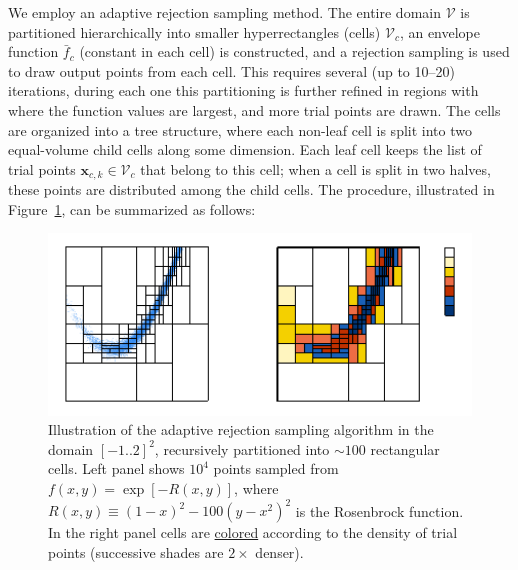 \documentclass[12pt]{article}
\newcommand{\bx}{\boldsymbol{x}}
\begin{document}
We employ an adaptive rejection sampling method.
The entire domain $\mathcal{V}$ is partitioned hierarchically into smaller hyperrectangles (cells) $\mathcal{V}_c$, an envelope function $\bar f_c$ (constant in each cell) is constructed, and a rejection sampling is used to draw output points from each cell. This requires several (up to 10--20) iterations, during each one this partitioning is further refined in regions with where the function values are largest, and more trial points are drawn. The cells are organized into a tree structure, where each non-leaf cell is split into two equal-volume child cells along some dimension. Each leaf cell keeps the list of trial points $\bx_{c,k}\in\mathcal{V}_c$ that belong to this cell; when a cell is split in two halves, these points are distributed among the child cells.
The procedure, illustrated in Figure~\ref{fig:Sampling}, can be summarized as follows:

\begin{figure}
\begin{center}
\includegraphics[width=15cm]{Sampling.pdf}
\end{center}
\caption{Illustration of the adaptive rejection sampling algorithm in the domain $[-1..2]^2$, recursively partitioned into $\sim 100$ rectangular cells. Left panel shows $10^4$ points sampled from $f(x,y) = \exp[-R(x,y)]$, where $R(x,y) \equiv (1-x)^2-100(y-x^2)^2$ is the Rosenbrock function. In the right panel cells are \href{https://www.google.com/search?q=mondrian&tbm=isch}{colored} according to the density of trial points (successive shades are $2\times$ denser).
} \label{fig:Sampling}
\end{figure}
\end{document}
